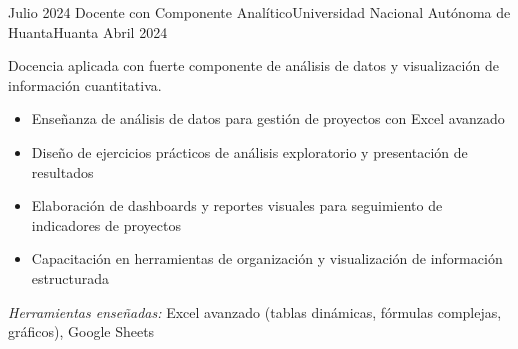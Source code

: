 \experience
{Julio 2024} {Docente con Componente Analítico}{Universidad Nacional Autónoma de Huanta}{Huanta}
{Abril 2024} {
	Docencia aplicada con fuerte componente de análisis de datos y visualización de información cuantitativa.
	\begin{itemize}
		\item Enseñanza de análisis de datos para gestión de proyectos con Excel avanzado
		\item Diseño de ejercicios prácticos de análisis exploratorio y presentación de resultados
		\item Elaboración de dashboards y reportes visuales para seguimiento de indicadores de proyectos
		\item Capacitación en herramientas de organización y visualización de información estructurada
	\end{itemize}
}
{\footnotesize{\emph{Herramientas enseñadas:} Excel avanzado (tablas dinámicas, fórmulas complejas, gráficos), Google Sheets}}
